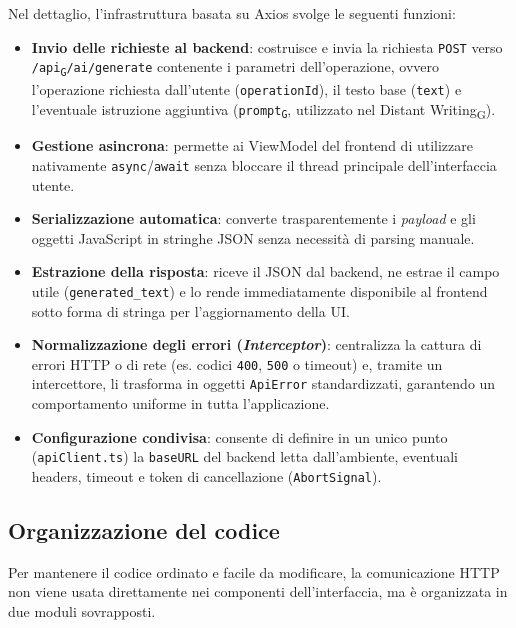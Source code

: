 \documentclass[11pt,a4paper]{article}
\newcommand{\gls}[1]{#1\textsubscript{G}}
\begin{document}
Nel dettaglio, l'infrastruttura basata su Axios svolge le seguenti funzioni:
\begin{itemize}
    \item \textbf{Invio delle richieste al backend}: costruisce e invia la richiesta \texttt{POST} verso \texttt{/\gls{api}/ai/generate} contenente i parametri dell'operazione, ovvero l'operazione richiesta dall'utente (\texttt{operationId}), il testo base (\texttt{text}) e l'eventuale istruzione aggiuntiva (\texttt{\gls{prompt}}, utilizzato nel \gls{Distant Writing}).
    \item \textbf{Gestione asincrona}: permette ai ViewModel del frontend di utilizzare nativamente \texttt{async}/\texttt{await} senza bloccare il thread principale dell'interfaccia utente.
    \item \textbf{Serializzazione automatica}: converte trasparentemente i \textit{payload} e gli oggetti JavaScript in stringhe JSON senza necessità di parsing manuale.
    \item \textbf{Estrazione della risposta}: riceve il JSON dal backend, ne estrae il campo utile (\texttt{generated\_text}) e lo rende immediatamente disponibile al frontend sotto forma di stringa per l'aggiornamento della UI.
    \item \textbf{Normalizzazione degli errori (\textit{Interceptor})}: centralizza la cattura di errori HTTP o di rete (es. codici \texttt{400}, \texttt{500} o timeout) e, tramite un intercettore, li trasforma in oggetti \texttt{ApiError} standardizzati, garantendo un comportamento uniforme in tutta l'applicazione.
    \item \textbf{Configurazione condivisa}: consente di definire in un unico punto (\texttt{apiClient.ts}) la \texttt{baseURL} del backend letta dall'ambiente, eventuali headers, timeout e token di cancellazione (\texttt{AbortSignal}).
\end{itemize}


\subsection{Organizzazione del codice}
Per mantenere il codice ordinato e facile da modificare, la comunicazione HTTP non viene usata direttamente nei componenti dell'interfaccia, ma è organizzata in due moduli sovrapposti.
\end{document}
